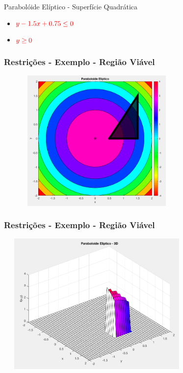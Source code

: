 \documentclass{beamer}
\begin{document}
\begin{frame}
{\begin{block}{Parabolóide Elíptico - Superfície Quadrática}
\begin{itemize}
			\item $\color{red} y - 1.5x + 0.75 \le 0$
			\item $\color{red} y \ge 0$
			\end{itemize}
		\end{block}
	}	
	{ 
  	    \frametitle{Restrições - Exemplo - Região Viável}
		\includegraphics[width=10cm,height=7cm]{restricoes3.png}
	}
	{ 
  	    \frametitle{Restrições - Exemplo - Região Viável}
		\includegraphics[width=10cm,height=7cm]{restricoes4.png}
	}
\end{frame}
\end{document}
